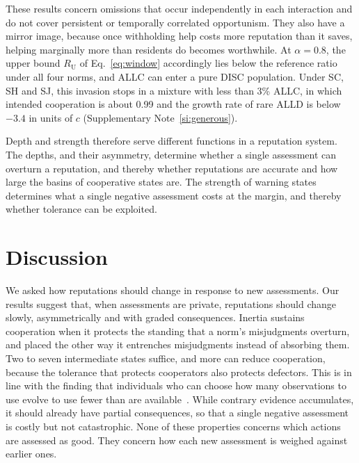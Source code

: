 \documentclass[10pt]{wlscirep}
\newif\ifdraftnotes
\DeclareRobustCommand{\draftnote}[1]{%
  \ifdraftnotes{\color{red!60!black}\sffamily\footnotesize[#1]}\fi}
\theoremstyle{plain}
\theoremstyle{remark}
\begin{document}
These results concern omissions that occur independently in each interaction and do not cover persistent or temporally correlated opportunism. They also have a mirror image, because once withholding help costs more reputation than it saves, helping marginally more than residents do becomes worthwhile. At $\alpha=0.8$, the upper bound $R_{\mathrm U}$ of Eq.~\eqref{eq:window} accordingly lies below the reference ratio under all four norms, and ALLC can enter a pure DISC population. Under SC, SH and SJ, this invasion stops in a mixture with less than 3\% ALLC, in which intended cooperation is about 0.99 and the growth rate of rare ALLD is below $-3.4$ in units of $c$ (Supplementary Note~\ref{si:generous}).
\draftnote{The DISC--ALLC mixtures at $\alpha=0.8$ (Supplementary Table~\ref{tab:si-generous}) were reproduced on 25 November 2026 with an independent implementation of the mean-field equations. Add this calculation to the verified package before submission.}

Depth and strength therefore serve different functions in a reputation system. The depths, and their asymmetry, determine whether a single assessment can overturn a reputation, and thereby whether reputations are accurate and how large the basins of cooperative states are. The strength of warning states determines what a single negative assessment costs at the margin, and thereby whether tolerance can be exploited.

\section*{Discussion}

We asked how reputations should change in response to new assessments. Our results suggest that, when assessments are private, reputations should change slowly, asymmetrically and with graded consequences. Inertia sustains cooperation when it protects the standing that a norm's misjudgments overturn, and placed the other way it entrenches misjudgments instead of absorbing them. Two to seven intermediate states suffice, and more can reduce cooperation, because the tolerance that protects cooperators also protects defectors. This is in line with the finding that individuals who can choose how many observations to use evolve to use fewer than are available~\cite{michelmata2024}. While contrary evidence accumulates, it should already have partial consequences, so that a single negative assessment is costly but not catastrophic. None of these properties concerns which actions are assessed as good. They concern how each new assessment is weighed against earlier ones.
\end{document}
